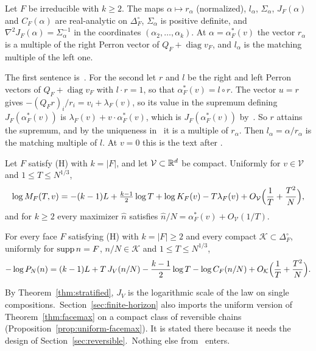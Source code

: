 \begin{proposition}\label{prop:constant}
Let $F$ be irreducible with $k\ge2$. The maps $\alpha\mapsto r_\alpha$ (normalized),
$l_\alpha$, $\Sigma_\alpha$, $J_F(\alpha)$ and $C_F(\alpha)$ are real-analytic on
$\Delta_F^\circ$, $\Sigma_\alpha$ is positive definite, and $\nabla^2J_F(\alpha)=\Sigma_\alpha^{-1}$ in the
coordinates $(\alpha_2,\dots,\alpha_k)$. At $\alpha=\alpha^*_F(v)$ the vector $r_\alpha$ is
a multiple of the right Perron vector of $Q_F+\operatorname{diag}v_F$, and $l_\alpha$ is
the matching multiple of the left one.
\end{proposition}

The first sentence is~\cite[Proposition~5.2(a)]{paperC1}. For the second let $r$ and $l$ be the
right and left Perron vectors of $Q_F+\operatorname{diag}v_F$ with $l\cdot r=1$, so that
$\alpha^*_F(v)=l\circ r$. The vector $u=r$ gives $-(Q_Fr)_i/r_i=v_i+\lambda_F(v)$, so its value in
the supremum defining $J_F(\alpha^*_F(v))$ is $\lambda_F(v)+v\cdot\alpha^*_F(v)$, which is
$J_F(\alpha^*_F(v))$ by~\cite[Proposition~3.3(a)]{paperC1}. So $r$ attains the supremum, and by
the uniqueness in~\cite[Proposition~3.3(b)]{paperC1} it is a multiple of $r_\alpha$. Then
$l_\alpha=\alpha/r_\alpha$ is the matching multiple of $l$. At $v=0$ this is the text after
\cite[Definition~5.1]{paperC1}.

\begin{theorem}\label{thm:facemax}
Let $F$ satisfy \textup{(H)} with $k=|F|$, and let $\mathcal V\subset\mathbb{R}^d$ be compact.
Uniformly for $v\in\mathcal V$ and $1\le T\le N^{1/3}$,
\begin{equation}\label{eq:logmax}
 \log M_F(T,v)=-(k-1)L+\tfrac{k-1}2\log T+\log K_F(v)-T\lambda_F(v)
 +O_{\mathcal V}\Bigl(\frac1T+\frac{T^2}N\Bigr),
\end{equation}
and for $k\ge2$ every maximizer $\hat n$ satisfies $\hat n/N=\alpha^*_F(v)+O_{\mathcal V}(1/T)$.
\end{theorem}

\begin{theorem}\label{thm:stratified}
For every face $F$ satisfying \textup{(H)} with $k=|F|\ge2$ and every compact
$\mathcal K\subset\Delta_F^\circ$, uniformly for $\operatorname{supp} n=F$, $n/N\in\mathcal K$ and
$1\le T\le N^{1/3}$,
\[
 -\log P_N(n)=(k-1)L+T\,J_V(n/N)-\frac{k-1}2\log T-\log C_F(n/N)
 +O_{\mathcal K}\Bigl(\frac1T+\frac{T^2}N\Bigr).
\]
\end{theorem}

By Theorem~\ref{thm:stratified}, $J_V$ is the logarithmic scale of the law on single
compositions.\ifarxivbuild\ Section~\ref{sec:finite-horizon} also imports the uniform version
of Theorem~\ref{thm:facemax} on a compact class of reversible chains
(Proposition~\ref{prop:uniform-facemax}). It is stated there because it needs the design of
Section~\ref{sec:reversible}.\fi\ Nothing else from~\cite{paperC1} enters.

